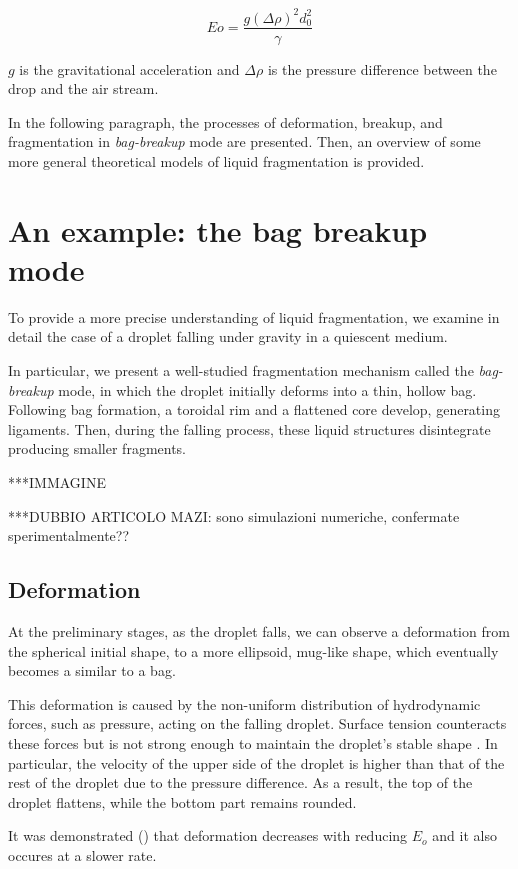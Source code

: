 \begin{equation}
    Eo = \frac{g (\Delta \rho)^2 d_0^2}{\gamma}
    \label{eq:weber_number}
\end{equation}

$g$ is the gravitational acceleration and $\Delta \rho$ is the pressure difference between the drop and the air stream.

In the following paragraph, the processes of deformation, breakup, and fragmentation in \textit{bag-breakup} mode are presented. Then, an overview of some more general theoretical models of liquid fragmentation is provided.

\section{An example: the bag breakup mode }

To provide a more precise understanding of liquid fragmentation, we examine in detail the case of a droplet falling under gravity in a quiescent medium. 

In particular, we present a well-studied fragmentation mechanism called the \textit{bag-breakup} mode, in which the droplet initially deforms into a thin, hollow bag. Following bag formation, a toroidal rim and a flattened core develop, generating ligaments. Then, during the falling process, these liquid structures disintegrate producing smaller fragments.

***IMMAGINE

***DUBBIO ARTICOLO MAZI: sono simulazioni numeriche, confermate sperimentalmente??
\subsection{Deformation}
At the preliminary stages, as the droplet falls, we can observe a deformation from the spherical initial shape, to a more ellipsoid, mug-like shape, which eventually becomes a similar to a bag. 

This deformation is caused by the non-uniform distribution of hydrodynamic forces, such as pressure, acting on the falling droplet. Surface tension counteracts these forces but is not strong enough to maintain the droplet's stable shape \cite{Mazi_article}. In particular, the velocity of the upper side of the droplet is higher than that of the rest of the droplet due to the pressure difference. As a result, the top of the droplet flattens, while the bottom part remains rounded.

It was demonstrated (\cite{Mazi_article}) that deformation decreases with reducing $E_o$ and it also occures at a slower rate. 

